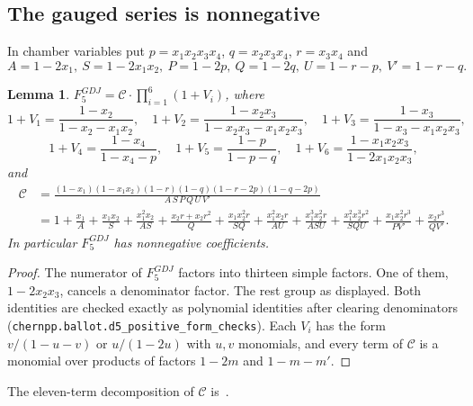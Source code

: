 \documentclass[11pt,a4paper]{article}
\theoremstyle{plain}
\newtheorem{lemma}[theorem]{Lemma}
\theoremstyle{definition}
\theoremstyle{remark}
\begin{document}
\subsection{The gauged series is nonnegative}

In chamber variables put $p = x_1x_2x_3x_4$, $q = x_2x_3x_4$, $r = x_3x_4$ and
\[
  A = 1 - 2x_1,\ S = 1 - 2x_1x_2,\ P = 1 - 2p,\ Q = 1 - 2q,\ U = 1 - r - p,\ V' = 1 - r - q .
\]

\begin{lemma}\label{lem:f5}
$F_5^{GDJ} = \mathcal C \cdot \prod_{i=1}^6 (1 + V_i)$, where
\[
  1 + V_1 = \frac{1 - x_2}{1 - x_2 - x_1x_2},\quad
  1 + V_2 = \frac{1 - x_2x_3}{1 - x_2x_3 - x_1x_2x_3},\quad
  1 + V_3 = \frac{1 - x_3}{1 - x_3 - x_1x_2x_3},
\]
\[
  1 + V_4 = \frac{1 - x_4}{1 - x_4 - p},\quad
  1 + V_5 = \frac{1 - p}{1 - p - q},\quad
  1 + V_6 = \frac{1 - x_1x_2x_3}{1 - 2x_1x_2x_3},
\]
and
\[
\begin{aligned}
  \mathcal C &= \frac{(1-x_1)(1-x_1x_2)(1-r)(1-q)(1-r-2p)(1-q-2p)}{A\,S\,P\,Q\,U\,V'} \\
  &= 1 + \frac{x_1}{A} + \frac{x_1x_2}{S} + \frac{x_1^2x_2}{AS} + \frac{x_2r + x_2r^2}{Q}
    + \frac{x_1x_2^2r}{SQ} + \frac{x_1^2x_2r}{AU} + \frac{x_1^3x_2^2r}{ASU}
    + \frac{x_1^2x_2^3r^2}{SQU} + \frac{x_1x_2^2r^3}{PV'} + \frac{x_2r^3}{QV'} .
\end{aligned}
\]
In particular $F_5^{GDJ}$ has nonnegative coefficients.
\end{lemma}

\begin{proof}
The numerator of $F_5^{GDJ}$ factors into thirteen simple factors. One of them,
$1 - 2x_2x_3$, cancels a denominator factor. The rest group as displayed. Both identities are
checked exactly as polynomial identities after clearing denominators
(\texttt{chernpp.ballot.d5\_positive\_form\_checks}). Each $V_i$ has the form $v/(1-u-v)$ or
$u/(1-2u)$ with $u, v$ monomials, and every term of $\mathcal C$ is a monomial over products of
factors $1 - 2m$ and $1 - m - m'$.
\end{proof}

The eleven-term decomposition of $\mathcal C$ is~\cite[(16)]{FS}.
\end{document}
